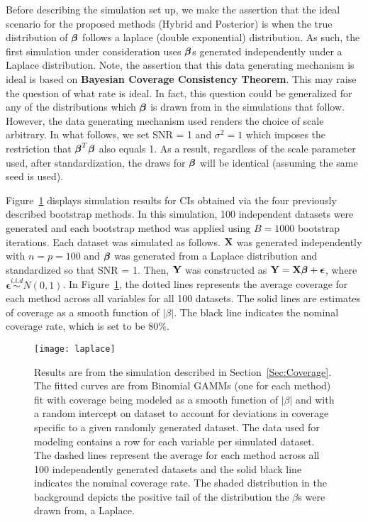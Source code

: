 Before describing the simulation set up, we make the assertion that the ideal scenario for the proposed methods (Hybrid and Posterior) is when the true distribution of $\boldsymbol{\beta}$ follows a laplace (double exponential) distribution. As such, the first simulation under consideration uses $\boldsymbol{\beta}$s generated independently under a Laplace distribution. Note, the assertion that this data generating mechanism is ideal is based on \textbf{Bayesian Coverage Consistency Theorem}. This may raise the question of what rate is ideal. In fact, this question could be generalized for any of the distributions which $\boldsymbol{\beta}$ is drawn from in the simulations that follow. However, the data generating mechanism used renders the choice of scale arbitrary. In what follows, we set SNR = 1 and $\sigma^2 = 1$ which imposes the restriction that $\boldsymbol{\beta}^T\boldsymbol{\beta}$ also equals 1. As a result, regardless of the scale parameter used, after standardization, the draws for $\boldsymbol{\beta}$ will be identical (assuming the same seed is used).

Figure~\ref{Fig:laplace} displays simulation results for CIs obtained via the four previously described bootstrap methods. In this simulation, 100 independent datasets were generated and each bootstrap method was applied using $B = 1000$ bootstrap iterations. Each dataset was simulated as follows. $\mathbf{X}$ was generated independently with $n = p = 100$ and $\boldsymbol{\beta}$ was generated from a Laplace distribution and standardized so that SNR = 1. Then, $\mathbf{Y}$ was constructed as $\mathbf{Y} = \mathbf{X}\boldsymbol{\beta} + \boldsymbol{\epsilon}$, where $\boldsymbol{\epsilon} \overset{i.i.d}{\sim} N(0, 1)$. In Figure~\ref{Fig:laplace}, the dotted lines represents the average coverage for each method across all variables for all 100 datasets. The solid lines are estimates of coverage as a smooth function of $|\beta|$. The black line indicates the nominal coverage rate, which is set to be 80\%.

\begin{figure}[hbtp]
  \begin{center}
  \texttt{[image: laplace]}
  \caption{\label{Fig:laplace} Results are from the simulation described in Section~\ref{Sec:Coverage}. The fitted curves are from Binomial GAMMs (one for each method) fit with coverage being modeled as a smooth function of $|\beta|$ and with a random intercept on dataset to account for deviations in coverage specific to a given randomly generated dataset. The data used for modeling contains a row for each variable per simulated dataset. The dashed lines represent the average for each method across all 100 independently generated datasets and the solid black line indicates the nominal coverage rate. The shaded distribution in the background depicts the positive tail of the distribution the $\beta$s were drawn from, a Laplace.}
  \end{center}
\end{figure}

